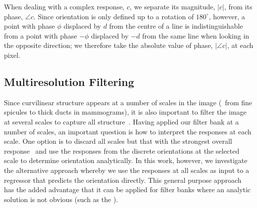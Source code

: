 When dealing with a complex response, $c$, we separate its magnitude, $|c|$, from its phase, $\angle c$. Since orientation is only defined up to a rotation of $180^\circ$, however, a point with phase $\phi$ displaced by $d$ from the centre of a line is indistinguishable from a point with phase $-\phi$ displaced by $-d$ from the same line when looking in the opposite direction; we therefore take the absolute value of phase, $|\angle c|$, at each pixel.


\subsection{Multiresolution Filtering}
Since curvilinear structure appears at a number of scales in the image (\eg~from fine spicules to thick ducts in mammograms), it is also important to filter the image at several scales to capture all structure~\cite{Lindeberg_IJCV98b}. Having applied our filter bank at a number of scales, an important question is how to interpret the responses at each scale. One option is to discard all scales but that with the strongest overall response~\cite{Karssemeijer_teBrake_TMI96} and use the responses from the discrete orientations at the selected scale to determine orientation analytically. In this work, however, we investigate the alternative approach whereby we use the responses at all scales as input to a regressor that predicts the orientation directly. This general purpose approach has the added advantage that it can be applied for filter banks where an analytic solution is not obvious (such as the \dtcwt{}).